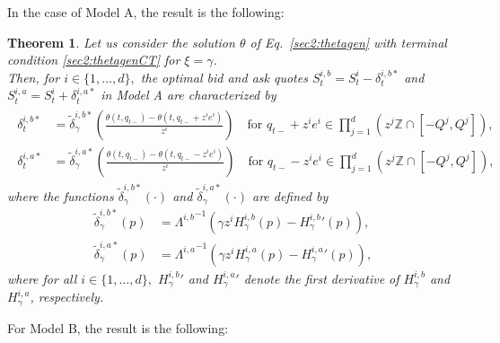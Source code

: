 \documentclass[preprint, 3p]{elsarticle}
\newcommand{\1}{{\chi}}
\newtheorem{theorem}{Theorem}
\begin{document}
In the case of Model A, the result is the following:
\begin{theorem}
\label{optquotes}
	Let us consider the solution $\theta$ of Eq.~\eqref{sec2:thetagen} with terminal condition \eqref{sec2:thetagenCT} for $\xi=\gamma$.\\
	
	Then, for $i \in \{1, \ldots, d\},$ the optimal bid and ask quotes $S^{i,b}_t = S^i_t - \delta^{i,b*}_t$ and $S^{i,a}_t = S^i_t + \delta^{i,a*}_t$ in Model A are characterized by\begin{align}
	\begin{split}
	\label{sec2:deltaoptimalA}
	\delta^{i,b*}_t &= \tilde{\delta}^{i,b*}_\gamma\left(\frac{\theta(t,q_{t-}) - \theta(t,q_{t-}+z^i e^i)}{z^i}\right) \quad \text{for } q_{t-}+z^i e^i \in \prod_{j=1}^d \left(z^j \mathbb Z \cap [-Q^j, Q^j]\right),\\
	\delta^{i,a*}_t &= \tilde{\delta}^{i,a*}_\gamma\left(\frac{\theta(t,q_{t-}) - \theta(t,q_{t-}-z^i e^i)}{z^i}\right) \quad \text{for } q_{t-}-z^i e^i \in \prod_{j=1}^d \left(z^j \mathbb Z \cap [-Q^j, Q^j]\right),
	\end{split}
	\end{align}where the functions $\tilde{\delta}^{i,b*}_\gamma(\cdot)$ and $\tilde{\delta}_\gamma^{i,a*}(\cdot)$ are defined by
	\begin{align*}
	\tilde{\delta}^{i,b*}_\gamma(p) &= {\Lambda^{i,b}}^{-1}\left(\gamma z^i H^{i,b}_{\gamma}(p) - {H_{\gamma}^{i,b}}'(p)\right),\\
	\tilde{\delta}^{i,a*}_\gamma(p) &= {\Lambda^{i,a}}^{-1}\left(\gamma z^i H^{i,a}_{\gamma}(p) - {H_{\gamma}^{i,a}}'(p)\right),
	\end{align*}
	where for all $i \in \{1, \ldots, d\},$ ${H_{\gamma}^{i,b}}'$ and ${H_{\gamma}^{i,a}}'$ denote the first derivative of ${H_{\gamma}^{i,b}}$ and ${H_{\gamma}^{i,a}}$, respectively.
\end{theorem}
For Model B, the result is the following:
\end{document}
